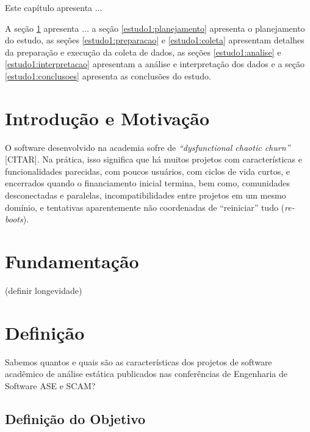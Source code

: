 {Este capítulo apresenta ...}

A seção \ref{estudo1:introducao} apresenta ...
a seção \ref{estudo1:planejamento} apresenta o planejamento do estudo,
as seções \ref{estudo1:preparacao} e \ref{estudo1:coleta} apresentam detalhes da preparação e execução da coleta de dados,
as seções \ref{estudo1:analise} e \ref{estudo1:interpretacao} apresentam a análise e interpretação dos dados e
a seção \ref{estudo1:conclusoes} apresenta as conclusões do estudo.


\section{Introdução e Motivação} \label{estudo1:introducao}

O software desenvolvido na academia sofre de {\it ``dysfunctional chaotic churn''} [CITAR].
Na prática, isso significa que há muitos projetos com características e funcionalidades parecidas, 
com poucos usuários, com ciclos de vida curtos, e encerrados quando o financiamento inicial termina,
bem como, comunidades desconectadas e paralelas, incompatibilidades entre projetos em um mesmo domínio, 
e tentativas aparentemente não coordenadas de ``reiniciar'' tudo ({\it re-boots}).

\section{Fundamentação}

(definir longevidade)

\section{Definição} \label{estudo1:definicao} %


Sabemos quantos e quais são as características dos projetos de software
acadêmico de análise estática publicados nas conferências de Engenharia de
Software ASE e SCAM?

\subsection{Definição do Objetivo}

